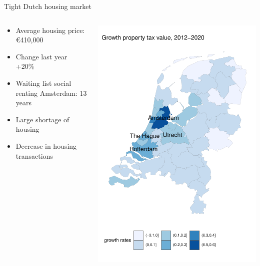 \documentclass{beamer}
\begin{document}
\begin{frame}{\alert{Tight} Dutch housing market}
	\begin{columns}
		\begin{column}{0.5\textwidth}
			\begin{itemize}
				\item Average housing price: \euro 410,000 \newline
				\item Change last year +20\% \newline
				\item \alert{Waiting list} social renting Amsterdam: 13 years \newline
				\item Large \alert{shortage} of housing \newline
				\item Decrease in housing \alert{transactions}
			\end{itemize}
		\end{column}
		\begin{column}{0.5\textwidth}
			\begin{center}
				\includegraphics[width=1\textwidth]{../../fig/growth_woz}
			\end{center}
		\end{column}
	\end{columns}
\end{frame}
\end{document}
